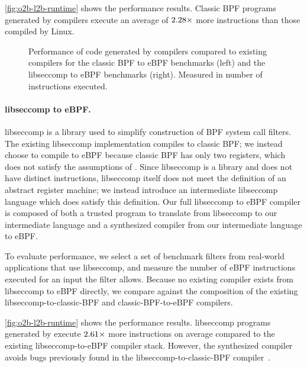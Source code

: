 \autoref{fig:o2b-l2b-runtime} shows the performance results.
%
Classic BPF programs generated by \jitsynth compilers execute
an average of $2.28\times$ more instructions
than those compiled by Linux.

\begin{figure}[ht]
  \resizebox{\textwidth}{!}{
  
  
  }
  \caption{Performance of code generated by \jitsynth compilers
  compared to existing compilers for the classic BPF to eBPF benchmarks
  (left) and the libseccomp to eBPF benchmarks (right). Measured in number
  of instructions executed.}
  \label{fig:o2b-l2b-runtime}
\end{figure}


\paragraph{libseccomp to eBPF.}

libseccomp is a library used to simplify construction of BPF system call filters.
%
The existing libseccomp implementation compiles to classic BPF; we instead choose
to compile to eBPF because classic BPF has only two registers, which does not satisfy
the assumptions of \jitsynth.
%
Since libseccomp is a library and does not have distinct instructions, libseccomp itself does not meet the definition of an abstract register machine; we instead introduce
an intermediate libseccomp language which does satisfy this definition.
%
Our full libseccomp to eBPF compiler is composed of both a trusted program to translate from libseccomp to our intermediate language and a synthesized compiler from our intermediate language to eBPF.

To evaluate performance, we select a set of benchmark filters from real-world
applications that use libseccomp, and measure the number of eBPF instructions
executed for an input the filter allows.
%
Because no existing compiler exists from libseccomp to eBPF directly,
we compare against the composition of the existing libseccomp-to-classic-BPF and classic-BPF-to-eBPF compilers.


\autoref{fig:o2b-l2b-runtime} shows the performance results.
%
libseccomp programs generated by \jitsynth execute
$2.61\times$ more instructions on average
compared to the existing libseccomp-to-eBPF compiler stack.
%
However, the synthesized compiler avoids bugs previously found
in the libseccomp-to-classic-BPF compiler~\cite{lsc:bug}.
%
%
%




